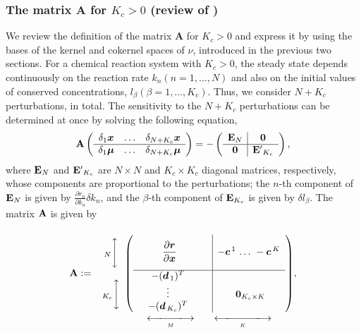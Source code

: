 \documentclass[ amsmath,amssymb,nofootinbib
]{revtex4-1}
\def\mbf#1{\mbox{\boldmath $#1$}}
\newcommand{\br}{{\mbf r}}
\newcommand{\p}{\partial}
\begin{document}
\subsubsection{The  matrix {\bf A} for $K_c>0$ (review of \cite{OMpre})} \label{sec:app_1.3}
We review the definition of the matrix {\bf A}  for $K_c>0$ \cite{OMpre} and express it by using the bases of the kernel and cokernel spaces of $\nu$, introduced in the previous two sections.
For a chemical reaction system with $K_c  >0$,  the steady state depends continuously on the reaction rate $k_n (n=1,\ldots, N)$  and also on  the initial values  of conserved concentrations, $l_\beta (\beta=1,\ldots, K_c)$. Thus,  we consider $N + K_c$ perturbations, in total. The sensitivity to the $N + K_c$ perturbations can be determined at once by solving the following equation,
\begin{align}
{\bf A} \left(
\begin{array}{cccc}
\delta_1 {  \mbf x} &  \ldots  &\delta_{N + K_c} { \mbf  x}  \\\hline
\delta_{1} {  \mbf \mu} &  \ldots & \delta_{N + K_c} {  \mbf \mu}  \\
\end{array}
\right)
= -   \left(
\begin{array}{c| c}
{\bf E}_{N}&{\bf  0}\\\hline
{\bf 0}& {\bf E'}_{K_c}
\end{array}
\right),\label{Adx=-E}
\end{align}
where
${\bf E}_{N}$  and  ${\bf E'}_{K_c}$ are  $N \times N$ and $K_c \times K_c$ diagonal matrices, respectively,
whose components are proportional to the perturbations;
the $n$-th  component of ${\bf E}_{N}$ is given by $\frac{\partial  r_n}{\partial k_n} \delta k_n$,
and the $\beta$-th component of ${\bf E}_{K_c}$ is given by  $\delta l_\beta$.
The matrix ${\bf A}$ is given by
\begin{align}
{\bf A}  :=  \begin{array}{c}
\\
\ _N \Bigg{\updownarrow} \\
\\
\ _{K_c}\Bigg{\updownarrow}\\
\\
\end{array}
\underset{\underset{M}{\xlongleftrightarrow[]{\hspace{4em}}} \ \ \ \ \ \ \underset{K}{\xlongleftrightarrow[]{\hspace{5em}}}}{\left(
\begin{array}{cccc|c }
&&&&  \\
&\mbox{\smash{ $\dfrac{\p \br  }{\p {\mbf x}}$}}&&&{ - {\mbf c}^{\,1}\ {\ldots}\ - {\mbf c}^{\,K}}\\
&&&&\\\hline
&{-({\mbf d}_{\,1})^T}& & &\\
&\vdots&&&\mbox{\smash{\ ${\bf 0}_{K_c \times K}$}} \\
&{-({\mbf d}_{\,K_{c}})^T}& & &
\end{array}
\right)}, \label{Amat}
\end{align}
\end{document}
